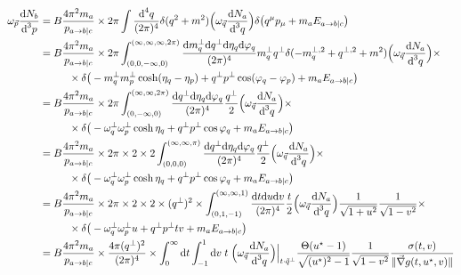 \begin{subequations}
    \begin{align}
        \omega_{\vec{p}}\frac{\text{d} N_b}{\text{d}^3p}&=B\frac{4\pi^2m_a}{p_{a\rightarrow b\vert c}}\times2\pi\int\frac{\text{d}^4q}{(2\pi)^4}\delta(q^2+m^2)\Big(\omega_{\vec{q}}\frac{\text{d} N_a}{\text{d}^3 q}\Big)\delta\big(q^\mu p_\mu+m_a E_{a\rightarrow b\vert c}\big)\\
        &=B\frac{4\pi^2m_a}{p_{a\rightarrow b\vert c}}\times2\pi\int_{(0,0,-\infty,0)}^{(\infty,\infty,\infty,2\pi)}\frac{\text{d} m_q^\perp \text{d} q^\perp\text{d}\eta_q\text{d}\varphi_q}{(2\pi)^4}m_q^\perp q^\perp\delta(-m_q^{\perp,2}+q^{\perp,2}+m^2)\Big(\omega_{\vec{q}}\frac{\text{d} N_a}{\text{d}^3 q}\Big)\times\nonumber\\
        &\phantom{=}\qquad\times\delta\big(-m_q^\perp m_p^\perp\cosh(\eta_q-\eta_p)+q^\perp p^\perp\cos(\varphi_q-\varphi_p)+m_a E_{a\rightarrow b\vert c}\big)\\
        &=B\frac{4\pi^2m_a}{p_{a\rightarrow b\vert c}}\times2\pi\int_{(0,-\infty,0)}^{(\infty,\infty,2\pi)}\frac{\text{d} q^\perp\text{d}\eta_q\text{d}\varphi_q}{(2\pi)^4}\frac{q^\perp}{2}\Big(\omega_{\vec{q}}\frac{\text{d} N_a}{\text{d}^3 q}\Big)\times\nonumber\\
        &\phantom{=}\qquad\times\delta\big(-\omega_q^\perp \omega_p^\perp\cosh\eta_q+q^\perp p^\perp\cos\varphi_q+m_a E_{a\rightarrow b\vert c}\big)\\
        &=B\frac{4\pi^2m_a}{p_{a\rightarrow b\vert c}}\times2\pi\times 2\times 2\int_{(0,0,0)}^{(\infty,\infty,\pi)}\frac{\text{d} q^\perp\text{d}\eta_q\text{d}\varphi_q}{(2\pi)^4}\frac{q^\perp}{2}\Big(\omega_{\vec{q}}\frac{\text{d} N_a}{\text{d}^3 q}\Big)\times\nonumber\\
        &\phantom{=}\qquad\times\delta\big(-\omega_q^\perp \omega_p^\perp\cosh\eta_q+q^\perp p^\perp\cos\varphi_q+m_a E_{a\rightarrow b\vert c}\big)\\
        &=B\frac{4\pi^2m_a}{p_{a\rightarrow b\vert c}}\times2\pi\times 2\times 2\times(q^\perp)^2\times\int_{(0,1,-1)}^{(\infty,\infty,1)}\frac{\text{d} t\text{d} u\text{d} v}{(2\pi)^4}\frac{t}{2}\Big(\omega_{\vec{q}}\frac{\text{d} N_a}{\text{d}^3 q}\Big)\frac{1}{\sqrt{1+u^2}}\frac{1}{\sqrt{1-v^2}}\times\nonumber\\
        &\phantom{=}\qquad\times\delta\big(-\omega_q^\perp \omega_p^\perp u+q^\perp p^\perp tv+m_a E_{a\rightarrow b\vert c}\big)\\
        &=B\frac{4\pi^2m_a}{p_{a\rightarrow b\vert c}}\times\frac{4\pi(q^\perp)^2}{(2\pi)^4}\times\int_0^\infty\text{d} t\int_{-1}^1\text{d} v\;t\;\Big(\omega_{\vec{q}}\frac{\text{d} N_a}{\text{d}^3 q}\Big)\Big\vert_{t\cdot \tilde{q}^\perp }\frac{\Theta(u^\star-1)}{\sqrt{(u^\star)^2-1}}\frac{1}{\sqrt{1-v^2}}\frac{\sigma(t,v)}{\Vert\vec{\nabla}g(t,u^\star,v)\Vert}
    \end{align}
\end{subequations}
